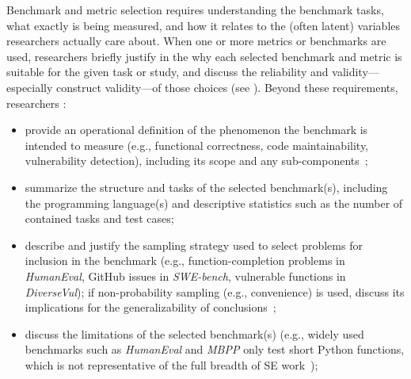 Benchmark and metric selection requires understanding the benchmark tasks, what exactly is being measured, and how it relates to the (often latent) variables researchers actually care about. When one or more metrics or benchmarks are used, researchers \must briefly justify in the \paper why each selected benchmark and metric is suitable for the given task or study, and \must discuss the reliability and validity---especially construct validity---of those choices (see \limitationsmitigations). Beyond these requirements, researchers \should:
\begin{itemize}
    \item provide an operational definition of the phenomenon the benchmark is intended to measure (e.g., functional correctness, code maintainability, vulnerability detection), including its scope and any sub-components~\cite{bean2025measuring};
    \item summarize the structure and tasks of the selected benchmark(s), including the programming language(s) and descriptive statistics such as the number of contained tasks and test cases;
    \item describe and justify the sampling strategy used to select problems for inclusion in the benchmark (e.g., function-completion problems in \emph{HumanEval}, GitHub issues in \emph{SWE-bench}, vulnerable functions in \emph{DiverseVul}); if non-probability sampling (e.g., convenience) is used, discuss its implications for the generalizability of conclusions~\cite{DBLP:journals/ese/BaltesR22, bean2025measuring};
    \item discuss the limitations of the selected benchmark(s) (e.g., widely used benchmarks such as \emph{HumanEval} \cite{DBLP:journals/corr/abs-2107-03374} and \emph{MBPP} \cite{DBLP:journals/corr/abs-2108-07732} only test short Python functions, which is not representative of the full breadth of SE work~\cite{Chandra2025benchmarks, Izadi2026benchmarking});

\end{itemize}
